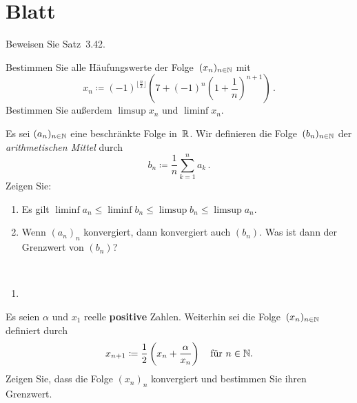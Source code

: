 \section{Blatt}

\begin{aufg}[6 Punkte]
Beweisen Sie Satz~3.42.
\end{aufg}

\bigskip

\begin{lsg}
\end{lsg}

\bigskip


\begin{aufg}[6 Punkte]
Bestimmen Sie alle H\"aufungswerte der Folge~$(x_n)_{n\in\mathbb{N}}$ mit 
\[
 x_n \coloneqq (-1)^{\lfloor \frac{n}{2}\rfloor} \left( 7 + (-1)^n\left(1+\frac1n\right)^{n+1} \right)\,. 
\]
Bestimmen Sie au{\ss}erdem $\limsup x_n$ und $\liminf x_n$.
\end{aufg}

\bigskip

\begin{lsg}
\end{lsg}

\bigskip

\begin{aufg}[6 Punkte]
Es sei $(a_n)_{n\in\mathbb{N}}$ eine beschr\"ankte Folge in~$\mathbb{R}$. Wir definieren die Folge~$(b_n)_{n\in\mathbb{N}}$ der \emph{arithmetischen Mittel} durch
\[
 b_n \coloneqq \frac1n\sum_{k=1}^n a_k\,.
\]
Zeigen Sie:
\begin{enumerate}[label=$\mathrm{(\roman*)}$, ref=$\mathrm{\roman*}$]
\item Es gilt $\liminf a_n \leq \liminf b_n \leq \limsup b_n \leq \limsup a_n$.
\item Wenn $(a_n)_n$ konvergiert, dann konvergiert auch $(b_n)$. Was ist dann der Grenzwert von $(b_n)$?
\end{enumerate}
\end{aufg}
 
\bigskip

\begin{lsg}\mbox{ }
\begin{enumerate}[label=$\mathrm{(\roman*)}$, ref=$\mathrm{\roman*}$]
\item 
\end{enumerate}
\end{lsg}

\bigskip

\begin{aufg}[6 Punkte]
Es seien $\alpha$ und $x_1$ reelle \textbf{positive} Zahlen. Weiterhin sei die Folge~$(x_n)_{n\in\mathbb{N}}$ definiert durch 
\[
 x_{n+1} \coloneqq \frac12\left(x_n + \frac{\alpha}{x_n}\right) \quad\text{f\"ur $n\in\mathbb{N}$.}
\]
Zeigen Sie, dass die Folge $(x_n)_n$ konvergiert und bestimmen Sie ihren Grenzwert.
\end{aufg}

\bigskip

\begin{lsg}  
\end{lsg}



